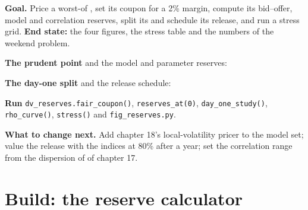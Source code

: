 \begin{tutorial}
\textbf{Goal.} Price a worst-of , set its coupon for a 2\% margin, compute its bid--offer, model and correlation reserves, split its  and
schedule its release, and run a stress grid. \textbf{End state:} the four figures, the stress table and the numbers of the weekend problem.
\begin{tutsteps}
\item \textbf{The prudent point} and the model and parameter reserves:
\label{lst:dv:managing-an-exotic-book:prudent}
\item \textbf{The day-one split} and the release schedule:
\label{lst:dv:managing-an-exotic-book:dayone}
\item \textbf{Run} \texttt{dv\_reserves.fair\_coupon()}, \texttt{reserves\_at(0)}, \texttt{day\_one\_study()}, \texttt{rho\_curve()}, \texttt{stress()} and
\texttt{fig\_reserves.py}.
\end{tutsteps}
\textbf{What to change next.} Add chapter 18's local-volatility pricer to the model set; value the release with the indices at 80\% after a year; set the correlation
range from the dispersion of  of chapter 17.
\end{tutorial}

\section{Build: the reserve calculator}\label{bld:dv:managing-an-exotic-book:reserves}

